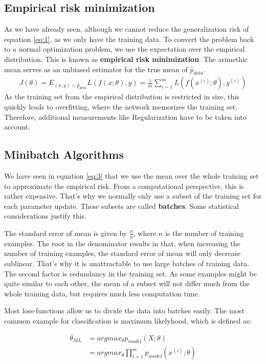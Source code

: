 \subsection{Empirical risk minimization}\label{sub:2} As we have already seen,
although we cannot reduce the generalization risk of equation \ref{eq:1}, as we
only have the training data. To convert the problem back to a normal
optimization problem, we use the expectation over the empirical distribution.
This is known as \textbf{empirical risk minimization}. The arimethic mean
serves as an unbiased estimator for the true mean of $\hat{p}_{data}$.
\begin{align}\label{eq:3}
    J(\theta) = E_{(x,y)\sim \hat{p}_{data}} L(f(x;\theta), y) = \frac{1}{m} \sum_{i=1}^m L(f(x^{(i)}; \theta), y^{(i)})
\end{align}
As the training set from the empirical distribution is restricted in size, this
quickly leads to overfitting, where the network memorizes the training set.
Therefore, additional measurements like Regularization have to be taken into
account.


\subsection{Minibatch Algorithms}\label{sub:Minibatch}
We have seen in equation \ref{eq:3} that we use the mean over the whole training
set to approximate the empirical risk. From a computational perspective, this is
rather expensive. That's why we normally only use a subset of the training set
for each parameter update. These subsets are called \textbf{batches}. Some statistical
considerations justify this.

The standard error of mean is given by $\frac{\sigma}{n}$, where $n$ is the
number of training examples. The root in the denominator results in that, when
increasing the number of training examples, the standard error of mean will
only decrease sublinear. That's why it is unattractable to use large batches of
training data. The second factor is redundancy in the training set. As some
examples might be quite similar to each other, the mean of a subset will not
differ much from the whole training data, but requires much less computation
time.

Most loss-functions allow us to divide the data into batches easily. The most
common example for classification is maximum likelyhood, which is defined as:

\begin{align}
    \theta_{ML}
    & = argmax_{\theta} p_{model}(X; \theta) \\
    & = argmax_{\theta} \prod_{i=1}^m p_{model}(x^{(i)}; \theta)
\end{align}

